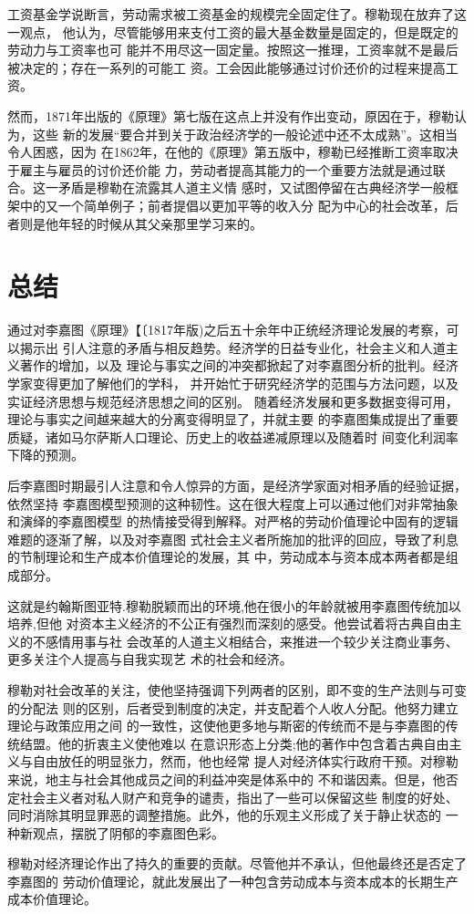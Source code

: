 工资基金学说断言，劳动需求被工资基金的规模完全固定住了。穆勒现在放弃了这一观点，
他认为，尽管能够用来支付工资的最大基金数量是固定的，但是既定的劳动力与工资率也可
能并不用尽这一固定量。按照这一推理，工资率就不是最后被决定的；存在一系列的可能工
资。工会因此能够通过讨价还价的过程来提高工资。

然而，1871年出版的《原理》第七版在这点上并没有作出变动，原因在于，穆勒认为，这些
新的发展“要合并到关于政治经济学的一般论述中还不太成熟”。这相当令人困惑，因为
在1862年，在他的《原理》第五版中，穆勒已经推断工资率取决于雇主与雇员的讨价还价能
力，劳动者提高其能力的一个重要方法就是通过联合。这一矛盾是穆勒在流露其人道主义情
感时，又试图停留在古典经济学一般框架中的又一个简单例子；前者提倡以更加平等的收入分
配为中心的社会改革，后者则是他年轻的时候从其父亲那里学习来的。

\section{总结}

通过对李嘉图《原理》【〔1817年版)之后五十余年中正统经济理论发展的考察，可以揭示出
引人注意的矛盾与相反趋势。经济学的日益专业化，社会主义和人道主义著作的增加，以及
理论与事实之间的冲突都掀起了对李嘉图分析的批判。经济学家变得更加了解他们的学科，
并开始忙于研究经济学的范围与方法问题，以及实证经济思想与规范经济思想之间的区别。
随着经济发展和更多数据变得可用，理论与事实之间越来越大的分离变得明显了，并就主要
的李嘉图集成提出了重要质疑，诸如马尔萨斯人口理论、历史上的收益递减原理以及随着时
间变化利润率下降的预测。

后李嘉图时期最引人注意和令人惊异的方面，是经济学家面对相矛盾的经验证据，依然坚持
李嘉图模型预测的这种韧性。这在很大程度上可以通过他们对非常抽象和演绎的李嘉图模型
的热情接受得到解释。对严格的劳动价值理论中固有的逻辑难题的逐渐了解，以及对李嘉图
式社会主义者所施加的批评的回应，导致了利息的节制理论和生产成本价值理论的发展，其
中，劳动成本与资本成本两者都是组成部分。

这就是约翰斯图亚特.穆勒脱颖而出的环境,他在很小的年龄就被用李嘉图传统加以培养,但他
对资本主义经济的不公正有强烈而深刻的感受。他尝试着将古典自由主义的不感情用事与社
会改革的人道主义相结合，来推进一个较少关注商业事务、更多关注个人提高与自我实现艺
术的社会和经济。

穆勒对社会改革的关注，使他坚持强调下列两者的区别，即不变的生产法则与可变的分配法
则的区别，后者受到制度的决定，并支配着个人收人分配。他努力建立理论与政策应用之间
的一致性，这使他更多地与斯密的传统而不是与李嘉图的传统结盟。他的折衷主义使他难以
在意识形态上分类;他的著作中包含着古典自由主义与自由放任的明显张力，然而，他也经常
提人对经济体实行政府干预。对穆勒来说，地主与社会其他成员之间的利益冲突是体系中的
不和谐因素。但是，他否定社会主义者对私人财产和竞争的谴责，指出了一些可以保留这些
制度的好处、同时消除其明显罪恶的调整措施。此外，他的乐观主义形成了关于静止状态的
一种新观点，摆脱了阴郁的李嘉图色彩。

穆勒对经济理论作出了持久的重要的贡献。尽管他并不承认，但他最终还是否定了李嘉图的
劳动价值理论，就此发展出了一种包含劳动成本与资本成本的长期生产成本价值理论。






